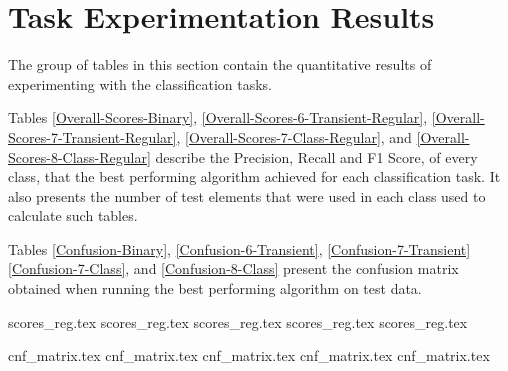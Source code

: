 \documentclass[a4paper,fleqn,usenatbib]{mnras}
\begin{document}


\appendix

\section{Task Experimentation Results}

The group of tables in this section contain the quantitative results of experimenting with the classification tasks. 

Tables \ref{Overall-Scores-Binary}, \ref{Overall-Scores-6-Transient-Regular}, \ref{Overall-Scores-7-Transient-Regular}, \ref{Overall-Scores-7-Class-Regular}, and  \ref{Overall-Scores-8-Class-Regular} describe the Precision, Recall and F1 Score, of every class, that the best performing algorithm achieved for each classification task. It also presents the number of test elements that were used in each class used to calculate such tables. 

Tables \ref{Confusion-Binary}, \ref{Confusion-6-Transient}, \ref{Confusion-7-Transient} \ref{Confusion-7-Class}, and  \ref{Confusion-8-Class} present the confusion matrix obtained when running the best performing algorithm on test data. 

\newpage
\pagebreak



{scores_reg.tex}
{scores_reg.tex}
{scores_reg.tex}
{scores_reg.tex}
{scores_reg.tex}

{cnf_matrix.tex}
{cnf_matrix.tex}
{cnf_matrix.tex}
{cnf_matrix.tex}
{cnf_matrix.tex}




\label{lastpage}
\end{document}
